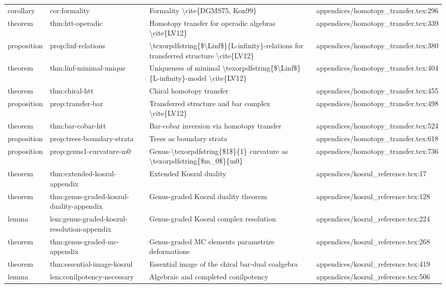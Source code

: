 \documentclass[11pt]{article}
\begin{document}
\begin{longtable}{L{0.10\textwidth}L{0.26\textwidth}L{0.42\textwidth}L{0.22\textwidth}}
corollary & cor:formality & Formality \textbackslash{}cite\{DGMS75, Kon99\} & appendices/homotopy\_transfer.tex:296\\
theorem & thm:htt-operadic & Homotopy transfer for operadic algebras \textbackslash{}cite\{LV12\} & appendices/homotopy\_transfer.tex:339\\
proposition & prop:linf-relations & \textbackslash{}texorpdfstring\{\$\textbackslash{}Linf\$\}\{L-infinity\}-relations for transferred structure \textbackslash{}cite\{LV12\} & appendices/homotopy\_transfer.tex:380\\
theorem & thm:linf-minimal-unique & Uniqueness of minimal \textbackslash{}texorpdfstring\{\$\textbackslash{}Linf\$\}\{L-infinity\}-model \textbackslash{}cite\{LV12\} & appendices/homotopy\_transfer.tex:404\\
theorem & thm:chiral-htt & Chiral homotopy transfer & appendices/homotopy\_transfer.tex:455\\
proposition & prop:transfer-bar & Transferred structure and bar complex \textbackslash{}cite\{LV12\} & appendices/homotopy\_transfer.tex:498\\
theorem & thm:bar-cobar-htt & Bar-cobar inversion via homotopy transfer & appendices/homotopy\_transfer.tex:524\\
proposition & prop:trees-boundary-strata & Trees as boundary strata & appendices/homotopy\_transfer.tex:618\\
proposition & prop:genus1-curvature-m0 & Genus-\textbackslash{}texorpdfstring\{\$1\$\}\{1\} curvature as \textbackslash{}texorpdfstring\{\$m\_0\$\}\{m0\} & appendices/homotopy\_transfer.tex:736\\
theorem & thm:extended-koszul-appendix & Extended Koszul duality & appendices/koszul\_reference.tex:17\\
theorem & thm:genus-graded-koszul-duality-appendix & Genus-graded Koszul duality theorem & appendices/koszul\_reference.tex:128\\
lemma & lem:genus-graded-koszul-resolution-appendix & Genus-graded Koszul complex resolution & appendices/koszul\_reference.tex:224\\
theorem & thm:genus-graded-mc-appendix & Genus-graded MC elements parametrize deformations & appendices/koszul\_reference.tex:268\\
theorem & thm:essential-image-koszul & Essential image of the chiral bar-dual coalgebra & appendices/koszul\_reference.tex:419\\
lemma & lem:conilpotency-necessary & Algebraic and completed conilpotency & appendices/koszul\_reference.tex:506\\

\end{longtable}
\end{document}
